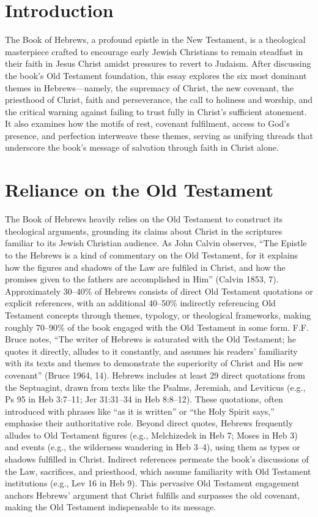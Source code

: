 \documentclass[12pt]{article}
\begin{document}
\section{Introduction}
The Book of Hebrews, a profound epistle in the New Testament, is a theological
masterpiece crafted to encourage early Jewish Christians to remain steadfast in
their faith in Jesus Christ amidst pressures to revert to Judaism. After
discussing the book’s Old Testament foundation, this essay explores the six
most dominant themes in Hebrews---namely, the supremacy of Christ, the new
covenant, the priesthood of Christ, faith and perseverance, the call to
holiness and worship, and the critical warning against failing to trust fully
in Christ’s sufficient atonement. It also examines how the motifs of rest,
covenant fulfilment, access to God’s presence, and perfection interweave these
themes, serving as unifying threads that underscore the book’s message of
salvation through faith in Christ alone.

\section{Reliance on the Old Testament}
The Book of Hebrews heavily relies on the Old Testament to construct its
theological arguments, grounding its claims about Christ in the scriptures
familiar to its Jewish Christian audience. As John Calvin observes, ``The
Epistle to the Hebrews is a kind of commentary on the Old Testament, for it
explains how the figures and shadows of the Law are fulfiled in Christ, and
how the promises given to the fathers are accomplished in Him'' (Calvin 1853,
7). Approximately 30--40\% of Hebrews consists of direct Old Testament
quotations or explicit references, with an additional 40--50\% indirectly
referencing Old Testament concepts through themes, typology, or theological
frameworks, making roughly 70--90\% of the book engaged with the Old Testament
in some form. F.F. Bruce notes, ``The writer of Hebrews is saturated with the
Old Testament; he quotes it directly, alludes to it constantly, and assumes his
readers’ familiarity with its texts and themes to demonstrate the superiority
of Christ and His new covenant'' (Bruce 1964, 14). Hebrews includes at least 29
direct quotations from the Septuagint, drawn from texts like the Psalms,
Jeremiah, and Leviticus (e.g., Ps 95 in Heb 3:7--11; Jer 31:31--34 in Heb
8:8--12). These quotations, often introduced with phrases like ``as it is
written'' or ``the Holy Spirit says,'' emphasise their authoritative role.
Beyond direct quotes, Hebrews frequently alludes to Old Testament figures
(e.g., Melchizedek in Heb 7; Moses in Heb 3) and events (e.g., the wilderness
wandering in Heb 3--4), using them as types or shadows fulfilled in Christ.
Indirect references permeate the book’s discussions of the Law, sacrifices, and
priesthood, which assume familiarity with Old Testament institutions (e.g., Lev
16 in Heb 9). This pervasive Old Testament engagement anchors Hebrews’ argument
that Christ fulfills and surpasses the old covenant, making the Old Testament
indispensable to its message.
\end{document}
